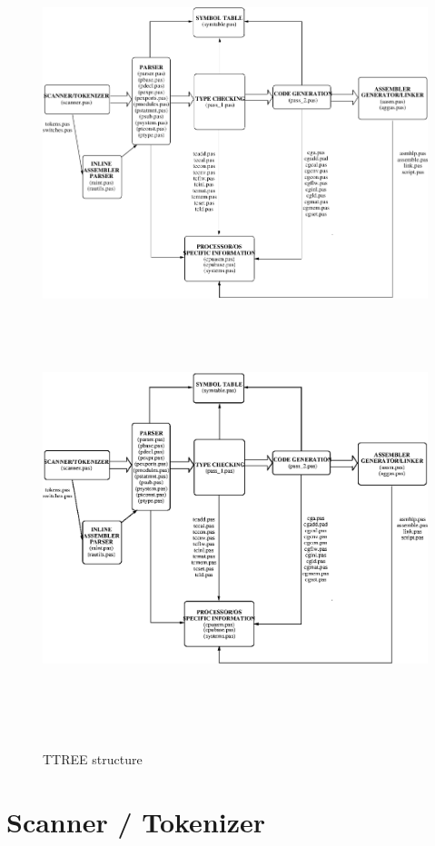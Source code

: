 \documentclass [12pt]{article}
\begin{document}
\begin{figure}
\ifpdf
 \includegraphics{arch1.pdf}
\else
\includegraphics[width=6.45in,height=4.95in]{arch1.eps}
\fi
\caption{TTREE structure}
\label{fig1}
\end{figure}

\section{Scanner / Tokenizer}
\end{document}
